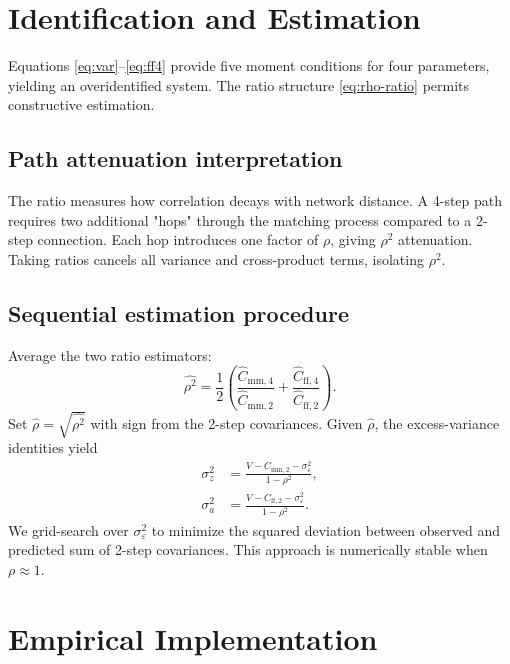 \documentclass[9pt,twocolumn,twoside]{pnas-new}
\begin{document}
\section*{Identification and Estimation}

Equations \eqref{eq:var}--\eqref{eq:ff4} provide five moment conditions for four parameters, yielding an overidentified system. The ratio structure \eqref{eq:rho-ratio} permits constructive estimation.

\subsection*{Path attenuation interpretation}
The ratio measures how correlation decays with network distance. A 4-step path requires two additional "hops" through the matching process compared to a 2-step connection. Each hop introduces one factor of $\rho$, giving $\rho^2$ attenuation. Taking ratios cancels all variance and cross-product terms, isolating $\rho^2$.

\subsection*{Sequential estimation procedure}
Average the two ratio estimators:
\begin{equation}
 \widehat{\rho^2} = \frac{1}{2}\left(\frac{\widehat C_{\text{mm},4}}{\widehat C_{\text{mm},2}} + \frac{\widehat C_{\text{ff},4}}{\widehat C_{\text{ff},2}}\right).
\end{equation}
Set $\widehat\rho = \sqrt{\widehat{\rho^2}}$ with sign from the 2-step covariances. Given $\widehat\rho$, the excess-variance identities yield
\begin{align}
 \sigma_z^2 &= \frac{V - C_{\text{mm},2} - \sigma_\varepsilon^2}{1 - \rho^2}, \\
 \sigma_a^2 &= \frac{V - C_{\text{ff},2} - \sigma_\varepsilon^2}{1 - \rho^2}.
\end{align}
We grid-search over $\sigma_\varepsilon^2$ to minimize the squared deviation between observed and predicted sum of 2-step covariances. This approach is numerically stable when $\rho \approx 1$.

\section*{Empirical Implementation}
\end{document}
